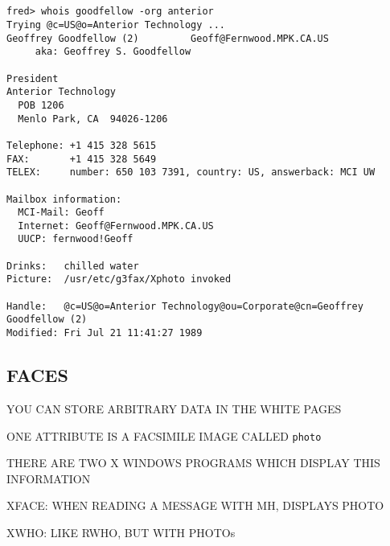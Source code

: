 \begin{bwslide}

\smaller
\begin{verbatim}


fred> whois goodfellow -org anterior
Trying @c=US@o=Anterior Technology ...
Geoffrey Goodfellow (2)         Geoff@Fernwood.MPK.CA.US
     aka: Geoffrey S. Goodfellow

President
Anterior Technology
  POB 1206
  Menlo Park, CA  94026-1206

Telephone: +1 415 328 5615
FAX:       +1 415 328 5649
TELEX:     number: 650 103 7391, country: US, answerback: MCI UW

Mailbox information:
  MCI-Mail: Geoff
  Internet: Geoff@Fernwood.MPK.CA.US
  UUCP: fernwood!Geoff

Drinks:   chilled water
Picture:  /usr/etc/g3fax/Xphoto invoked

Handle:   @c=US@o=Anterior Technology@ou=Corporate@cn=Geoffrey Goodfellow (2)
Modified: Fri Jul 21 11:41:27 1989
\end{verbatim}
\end{bwslide}


\begin{bwslide}
\part*	{FACES}\bf

\begin{nrtc}
\item	YOU CAN STORE ARBITRARY DATA IN THE WHITE PAGES

\item	ONE ATTRIBUTE IS A FACSIMILE IMAGE CALLED \verb"photo"

\item	THERE ARE TWO X WINDOWS PROGRAMS WHICH DISPLAY THIS INFORMATION
    \begin{nrtc}
    \item	XFACE: WHEN READING A MESSAGE WITH MH, DISPLAYS PHOTO

    \item	XWHO: LIKE RWHO, BUT WITH PHOTOs
    \end{nrtc}
\end{nrtc}
\end{bwslide}


